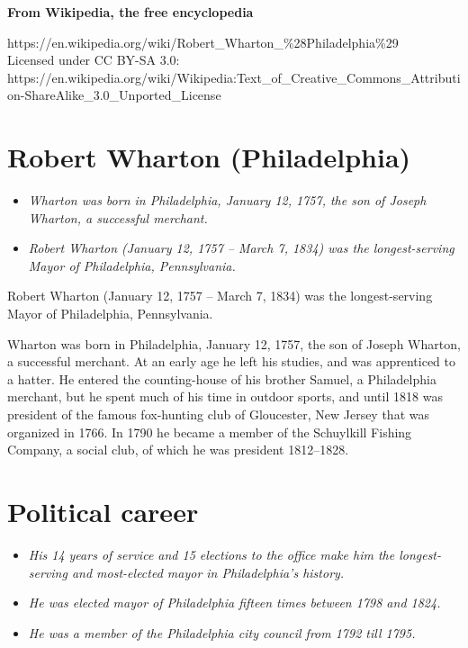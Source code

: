 \textbf{From Wikipedia, the free encyclopedia}

https://en.wikipedia.org/wiki/Robert\_Wharton\_\%28Philadelphia\%29\\
Licensed under CC BY-SA 3.0:\\
https://en.wikipedia.org/wiki/Wikipedia:Text\_of\_Creative\_Commons\_Attribution-ShareAlike\_3.0\_Unported\_License

\section{Robert Wharton
(Philadelphia)}\label{robert-wharton-philadelphia}

\begin{itemize}
\item
  \emph{Wharton was born in Philadelphia, January 12, 1757, the son of
  Joseph Wharton, a successful merchant.}
\item
  \emph{Robert Wharton (January 12, 1757 -- March 7, 1834) was the
  longest-serving Mayor of Philadelphia, Pennsylvania.}
\end{itemize}

Robert Wharton (January 12, 1757 -- March 7, 1834) was the
longest-serving Mayor of Philadelphia, Pennsylvania.

Wharton was born in Philadelphia, January 12, 1757, the son of Joseph
Wharton, a successful merchant. At an early age he left his studies, and
was apprenticed to a hatter. He entered the counting-house of his
brother Samuel, a Philadelphia merchant, but he spent much of his time
in outdoor sports, and until 1818 was president of the famous
fox-hunting club of Gloucester, New Jersey that was organized in 1766.
In 1790 he became a member of the Schuylkill Fishing Company, a social
club, of which he was president 1812--1828.

\section{Political career}\label{political-career}

\begin{itemize}
\item
  \emph{His 14 years of service and 15 elections to the office make him
  the longest-serving and most-elected mayor in Philadelphia's history.}
\item
  \emph{He was elected mayor of Philadelphia fifteen times between 1798
  and 1824.}
\item
  \emph{He was a member of the Philadelphia city council from 1792 till
  1795.}
\end{itemize}

